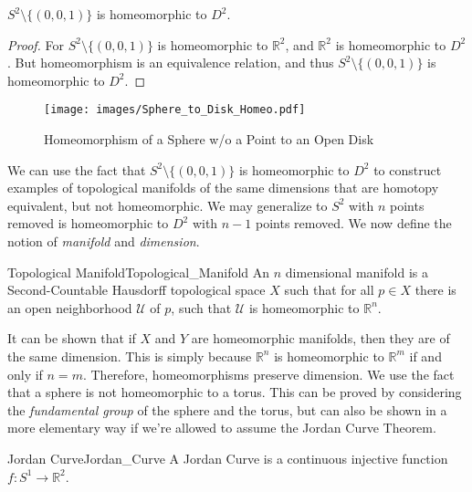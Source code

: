             \begin{theorem}
                $S^{2}\setminus\{(0,0,1)\}$ is homeomorphic to $D^{2}$.
            \end{theorem}
            \begin{proof}
                For $S^{2}\setminus\{(0,0,1)\}$ is homeomorphic to
                $\mathbb{R}^{2}$, and $\mathbb{R}^{2}$ is homeomorphic to
                $D^{2}$. But homeomorphism is an equivalence relation, and
                thus $S^{2}\setminus\{(0,0,1)\}$ is homeomorphic to $D^{2}$.
            \end{proof}
            \begin{figure}[H]
                \centering
                \captionsetup{type=figure}
                \texttt{[image: images/Sphere\_to\_Disk\_Homeo.pdf]}
                \caption{Homeomorphism of a Sphere w/o a Point to an Open Disk}
                \label{fig:homeomorphism_S_2_wo_North_Pole_and_R_2_2}
            \end{figure}
            We can use the fact that $S^{2}\setminus \{(0,0,1)\}$ is
            homeomorphic to $D^{2}$ to construct examples of topological
            manifolds of the same dimensions that are homotopy equivalent, but
            not homeomorphic. We may generalize to $S^{2}$ with $n$ points
            removed is homeomorphic to $D^{2}$ with $n-1$ points removed.
            We now define the notion of \textit{manifold} and
            \textit{dimension}.
            \begin{ldefinition}{Topological Manifold}{Topological_Manifold}
                An $n$ dimensional manifold is a Second-Countable Hausdorff
                topological space $X$ such that for all $p\in{X}$ there is an
                open neighborhood $\mathcal{U}$ of $p$, such that $\mathcal{U}$
                is homeomorphic to $\mathbb{R}^{n}$.
            \end{ldefinition}
            It can be shown that if $X$ and $Y$ are homeomorphic manifolds,
            then they are of the same dimension. This is simply because
            $\mathbb{R}^{n}$ is homeomorphic to $\mathbb{R}^{m}$ if and only if
            $n=m$. Therefore, homeomorphisms preserve dimension. We use the
            fact that a sphere is not homeomorphic to a torus. This can be
            proved by considering the \textit{fundamental group} of the sphere
            and the torus, but can also be shown in a more elementary way if
            we're allowed to assume the Jordan Curve Theorem.
            \begin{ldefinition}{Jordan Curve}{Jordan_Curve}
                A Jordan Curve is a continuous injective function
                $f:S^{1}\rightarrow\mathbb{R}^{2}$.
            \end{ldefinition}
